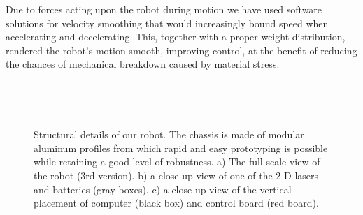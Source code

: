 Due to forces acting upon the robot during motion we have used software solutions for velocity smoothing that would increasingly bound speed when accelerating and decelerating. This, together with a proper weight distribution, rendered the robot's motion smooth, improving control, at the benefit of reducing the chances of mechanical breakdown caused by material stress.

\begin{figure}[h]
    \centering
    \begin{subfigure}[b]{0.22\textwidth}
      	\centering
        \caption{}
        \label{fig:aluminum_structure}
    \end{subfigure}
    ~
    \begin{subfigure}[b]{0.22\textwidth}
      	\centering
        \caption{}
        \label{fig:batteries}
    \end{subfigure}
    ~
    \begin{subfigure}[b]{0.22\textwidth}
      	\centering
        \caption{}
        \label{fig:computer}
    \end{subfigure}
    \caption{Structural details of our robot. The chassis is made of modular aluminum profiles from which rapid and easy prototyping is possible while retaining a good level of robustness. a) The full scale view of the robot (3rd version). b) a close-up view of one of the 2-D lasers and batteries (gray boxes). c) a close-up view of the vertical placement of computer (black box) and control board (red board).}
    \label{fig:structure_details}
\end{figure}


